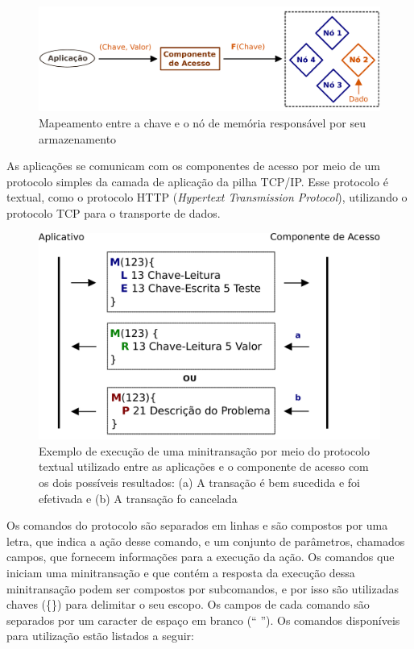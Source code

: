 \documentclass[11pt,twoside,a4paper]{book}
\begin{document}
\begin{figure}
  \centering
  \includegraphics[width=.80\textwidth]{funcao_espalhamento} 
  \caption{Mapeamento entre a chave e o nó de memória responsável por seu armazenamento}
  \label{fig:funcao_espalhamento} 
\end{figure}

As aplicações se comunicam com os componentes de acesso por meio de um protocolo simples da camada de aplicação da pilha TCP/IP. Esse protocolo é textual, como o protocolo HTTP (\emph{Hypertext Transmission Protocol}), utilizando o protocolo TCP para o transporte de dados. 

\begin{figure}
  \centering
  \includegraphics[width=.80\textwidth]{protocolo} 
  \caption{Exemplo de execução de uma minitransação por meio do protocolo textual utilizado entre as aplicações e o componente de acesso com os dois possíveis resultados: (a) A transação é bem sucedida e foi efetivada e (b) A transação fo cancelada}
  \label{fig:protocolo} 
\end{figure}

Os comandos do protocolo são separados em linhas e são compostos por uma letra, que indica a ação desse comando, e um conjunto de parâmetros, chamados campos, que fornecem informações para a execução da ação. Os comandos que iniciam uma minitransação e que contém a resposta da execução dessa minitransação podem ser compostos por subcomandos, e por isso são utilizadas chaves (\{\}) para delimitar o seu escopo. Os campos de cada comando são separados por um caracter de espaço em branco (`` ''). Os comandos disponíveis para utilização estão listados a seguir:
\end{document}
